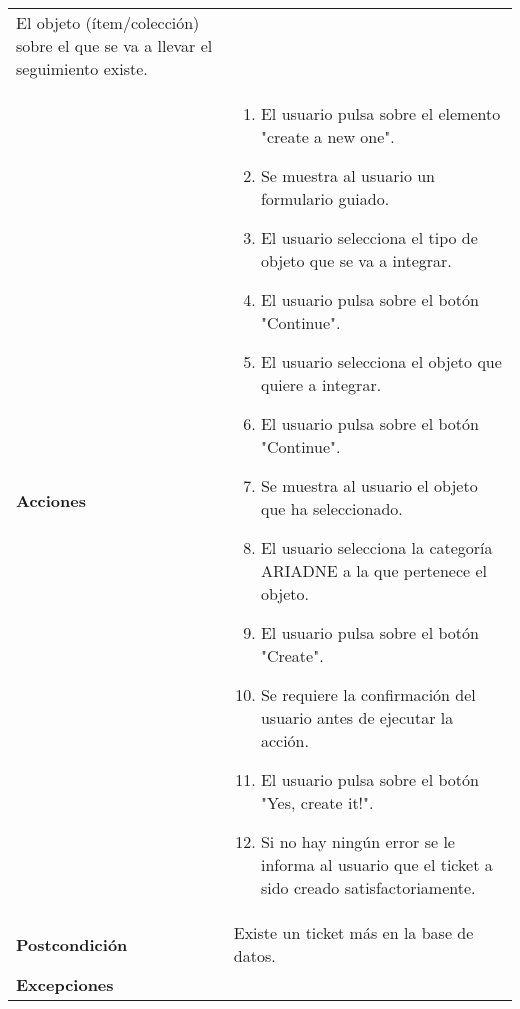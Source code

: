 \begin{longtable}[]{@{}ll@{}}
\begin{minipage}[t]{0.78\columnwidth}
El objeto (ítem/colección) sobre el que se va a llevar el seguimiento
existe.\strut
\end{minipage}\tabularnewline
\begin{minipage}[t]{0.16\columnwidth}\raggedright
\textbf{Acciones}\strut
\end{minipage} & \begin{minipage}[t]{0.78\columnwidth}\raggedright
\begin{enumerate}
\def\labelenumi{\arabic{enumi}.}
\tightlist
\item
  El usuario pulsa sobre el elemento "create a new one".
\item
  Se muestra al usuario un formulario guiado.
\item
  El usuario selecciona el tipo de objeto que se va a integrar.
\item
  El usuario pulsa sobre el botón "Continue".
\item
  El usuario selecciona el objeto que quiere a integrar.
\item
  El usuario pulsa sobre el botón "Continue".
\item
  Se muestra al usuario el objeto que ha seleccionado.
\item
  El usuario selecciona la categoría ARIADNE a la que pertenece el
  objeto.
\item
  El usuario pulsa sobre el botón "Create".
\item
  Se requiere la confirmación del usuario antes de ejecutar la acción.
\item
  El usuario pulsa sobre el botón "Yes, create it!".
\item
  Si no hay ningún error se le informa al usuario que el ticket a sido
  creado satisfactoriamente.
\end{enumerate}\strut
\end{minipage}\tabularnewline
\begin{minipage}[t]{0.16\columnwidth}\raggedright
\textbf{Postcondición}\strut
\end{minipage} & \begin{minipage}[t]{0.78\columnwidth}\raggedright
Existe un ticket más en la base de datos.\strut
\end{minipage}\tabularnewline
\begin{minipage}[t]{0.16\columnwidth}\raggedright
\textbf{Excepciones}\strut
\end{minipage} & \begin{minipage}[t]{0.78\columnwidth}\raggedright
\begin{itemize}

\end{itemize}
\end{minipage}
\end{longtable}
